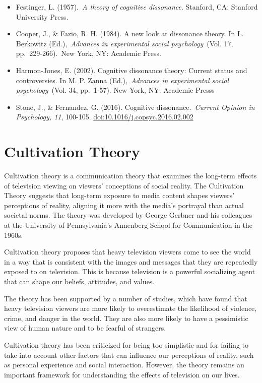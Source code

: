 \documentclass[
]{book}
\begin{document}
\begin{itemize}
\item
  Festinger, L. (1957).~\emph{A theory of cognitive dissonance}. Stanford, CA: Stanford University Press.
\item
  Cooper, J., \& Fazio, R. H. (1984). A new look at dissonance theory. In L. Berkowitz (Ed.),~\emph{Advances in experimental social psychology}~(Vol. 17, pp.~229-266).~New York, NY: Academic Press.
\item
  Harmon-Jones, E. (2002). Cognitive dissonance theory: Current status and controversies. In M. P. Zanna (Ed.),~\emph{Advances in experimental social psychology}~(Vol. 34, pp.~1-57). New York, NY: Academic Presss
\item
  Stone, J., \& Fernandez, G. (2016). Cognitive dissonance.~\emph{Current Opinion in Psychology, 11}, 100-105. \url{doi:10.1016/j.copsyc.2016.02.002}
\end{itemize}

\section{Cultivation Theory}\label{cultivation-theory}

Cultivation theory is a communication theory that examines the long-term effects of television viewing on viewers' conceptions of social reality. The Cultivation Theory suggests that long-term exposure to media content shapes viewers' perceptions of reality, aligning it more with the media's portrayal than actual societal norms. The theory was developed by George Gerbner and his colleagues at the University of Pennsylvania's Annenberg School for Communication in the 1960s.

Cultivation theory proposes that heavy television viewers come to see the world in a way that is consistent with the images and messages that they are repeatedly exposed to on television. This is because television is a powerful socializing agent that can shape our beliefs, attitudes, and values.

The theory has been supported by a number of studies, which have found that heavy television viewers are more likely to overestimate the likelihood of violence, crime, and danger in the world. They are also more likely to have a pessimistic view of human nature and to be fearful of strangers.

Cultivation theory has been criticized for being too simplistic and for failing to take into account other factors that can influence our perceptions of reality, such as personal experience and social interaction. However, the theory remains an important framework for understanding the effects of television on our lives.
\end{document}
